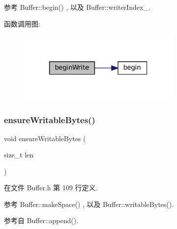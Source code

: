 参考 Buffer\+::begin() , 以及 Buffer\+::writer\+Index\+\_\+.

函数调用图\+:
\nopagebreak
\begin{figure}[H]
\begin{center}
\leavevmode
\includegraphics[width=229pt]{classmuduo_1_1Buffer_a46f79eca290d4d4cee634e3c1b50c57d_cgraph}
\end{center}
\end{figure}
\mbox{\label{classmuduo_1_1Buffer_a1185aa5bbe069f50c8d46a9f8d5aac32}} 
\subsubsection{\texorpdfstring{ensure\+Writable\+Bytes()}{ensureWritableBytes()}}
{\footnotesize\ttfamily void ensure\+Writable\+Bytes (\begin{DoxyParamCaption}\item[{size\+\_\+t}]{len }\end{DoxyParamCaption})\hspace{0.3cm}{\ttfamily [inline]}}



在文件 Buffer.\+h 第 109 行定义.



参考 Buffer\+::make\+Space() , 以及 Buffer\+::writable\+Bytes().



参考自 Buffer\+::append().


